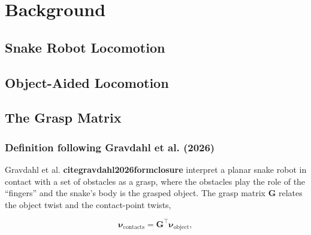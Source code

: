 \chapter{Background}
\label{chap:background}


\section{Snake Robot Locomotion}

\section{Object-Aided Locomotion}

\section{The Grasp Matrix}
\label{sec:grasp-matrix}

\subsection{Definition following Gravdahl et al. (2026)}
\label{sec:grasp-matrix-gravdahl}

Gravdahl et al. \textbf{cite{gravdahl2026formclosure}} interpret a planar snake robot in contact
with a set of obstacles as a grasp, where the obstacles play the role of the
``fingers'' and the snake's body is the grasped object. The grasp matrix
$\boldsymbol{G}$ relates the object twist and the contact-point twists,

\begin{equation}
    \boldsymbol{\nu}_{\text{contacts}} = \boldsymbol{G}^\top \boldsymbol{\nu}_{\text{object}} ,
    \label{eq:grasp-matrix-velocity}
\end{equation}

